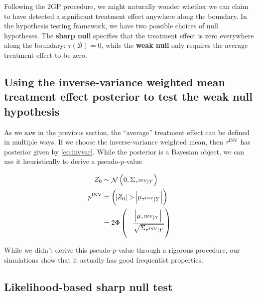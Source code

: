 \documentclass[letter]{article}
\let\Pr\relax
\DeclareMathOperator{\Pr}{\mathbb{P}}
\DeclareMathOperator{\normal}{\mathcal{N}}
\newcommand{\boundary}{\mathcal{B}}
\newcommand{\invvar}{\tau^{\mathrm{INV}}}
\begin{document}
\label{sec:hypothesis_testing}
    	Following the 2GP procedure, we might naturally wonder whether we can claim to have detected a significant treatment effect anywhere along the boundary.
In the hypothesis testing framework, we have two possible choices of null hypotheses.
The \textbf{sharp null} specifies that the treatment effect is zero everywhere along the boundary:
\(\tau(\boundary)=0\),
while the \textbf{weak null} only requires the average treatment effect to be zero.

\subsection{Using the inverse-variance weighted mean treatment effect posterior to test the weak null hypothesis}\label{using-the-inverse-variance-weighted-mean-treatment-effect-posterior-to-test-the-weak-null-hypothesis}

As we saw in the previous section, the ``average'' treatment effect can be defined in multiple ways.
If we choose the inverse-variance weighted mean, then \(\invvar\) has posterior given by \eqref{eq:invvar}.
While the posterior is a Bayesian object, we can use it heuristically to derive a pseudo-\(p\)-value

\begin{equation}
\begin{split}
    Z_0 &\sim \normal\del{0, \Sigma_{\invvar \mid Y}}  \\
    p^{\mathrm{INV}} &= \Pr\del{ 
        \abs{Z_0} > 
        \abs{
            \mu_{
                \invvar \mid Y
            }
        } 
    } \\
    &= 2\Phi\del{-
        \frac{
            \abs{
                \mu_{
                    \invvar \mid Y
                }
            }
        }{
            \sqrt{
                \Sigma_{\invvar \mid Y}
            }
        }
    }
\end{split}
\end{equation}

While we didn't derive this pseudo-\(p\)-value through a rigorous procedure, our simulations show that it actually has good frequentist properties.
    


    	\subsection{Likelihood-based sharp null test}\label{likelihood-based-sharp-null-test}
\end{document}

